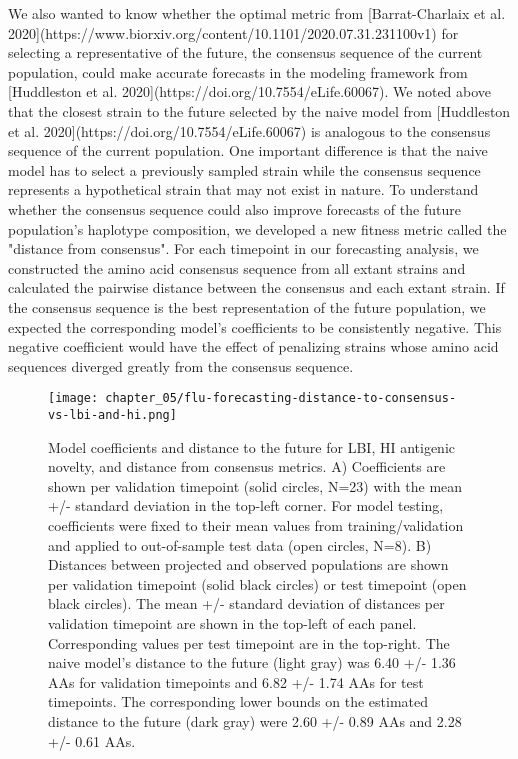 We also wanted to know whether the optimal metric from [Barrat-Charlaix et al. 2020](https://www.biorxiv.org/content/10.1101/2020.07.31.231100v1) for selecting a representative of the future, the consensus sequence of the current population, could make accurate forecasts in the modeling framework from [Huddleston et al. 2020](https://doi.org/10.7554/eLife.60067).
We noted above that the closest strain to the future selected by the naive model from [Huddleston et al. 2020](https://doi.org/10.7554/eLife.60067) is analogous to the consensus sequence of the current population.
One important difference is that the naive model has to select a previously sampled strain while the consensus sequence represents a hypothetical strain that may not exist in nature.
To understand whether the consensus sequence could also improve forecasts of the future population's haplotype composition, we developed a new fitness metric called the "distance from consensus".
For each timepoint in our forecasting analysis, we constructed the amino acid consensus sequence from all extant strains and calculated the pairwise distance between the consensus and each extant strain.
If the consensus sequence is the best representation of the future population, we expected the corresponding model's coefficients to be consistently negative.
This negative coefficient would have the effect of penalizing strains whose amino acid sequences diverged greatly from the consensus sequence.

\begin{figure}
  \centering
  \texttt{[image: chapter\_05/flu-forecasting-distance-to-consensus-vs-lbi-and-hi.png]}
  \caption{Model coefficients and distance to the future for LBI, HI antigenic novelty, and distance from consensus metrics.
    A) Coefficients are shown per validation timepoint (solid circles, N=23) with the mean +/- standard deviation in the top-left corner.
    For model testing, coefficients were fixed to their mean values from training/validation and applied to out-of-sample test data (open circles, N=8).
    B) Distances between projected and observed populations are shown per validation timepoint (solid black circles) or test timepoint (open black circles).
    The mean +/- standard deviation of distances per validation timepoint are shown in the top-left of each panel.
    Corresponding values per test timepoint are in the top-right.
    The naive model's distance to the future (light gray) was 6.40 +/- 1.36 AAs for validation timepoints and 6.82 +/- 1.74 AAs for test timepoints.
    The corresponding lower bounds on the estimated distance to the future (dark gray) were 2.60 +/- 0.89 AAs and 2.28 +/- 0.61 AAs.\label{fig:distance-to-consensus-performance} }
\end{figure}

